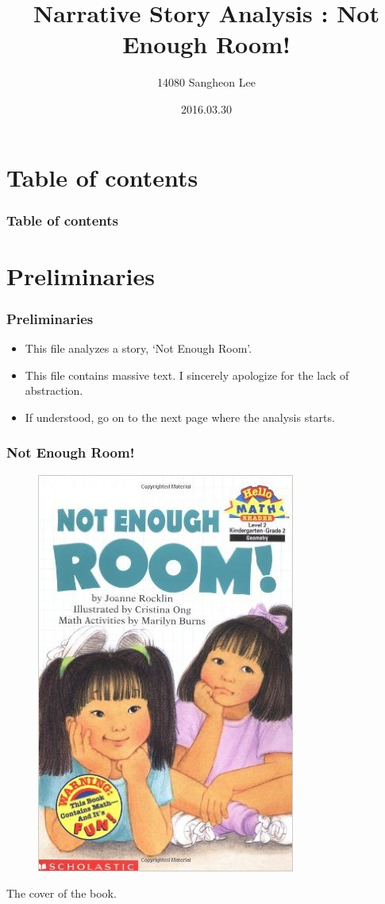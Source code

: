 \documentclass{beamer}
\begin{document}
	
	\begin{frame}
		\title{Narrative Story Analysis : Not Enough Room!}
		\author{14080 Sangheon Lee}
		\date{2016.03.30}
		\titlepage
	\end{frame}
	
	\section*{Table of contents}
	\begin{frame}
		\frametitle{Table of contents}
		\setcounter{tocdepth}{1}
		\tableofcontents
	\end{frame}
	
	\section*{Preliminaries}
	\begin{frame}
		\frametitle{Preliminaries}
		\begin{itemize}
			\item This file analyzes a story, `Not Enough Room'.
			\item This file contains massive text. I sincerely apologize for the lack of abstraction.
			\item If understood, go on to the next page where the analysis starts.
		\end{itemize}
	\end{frame}
	
	\begin{frame}
		\frametitle{Not Enough Room!}
		\begin{figure}
			\centering
			\includegraphics[scale=0.3]{res/cover.jpg}
		\end{figure}
		\centering
		The cover of the book.
	\end{frame}
	
\end{document}
